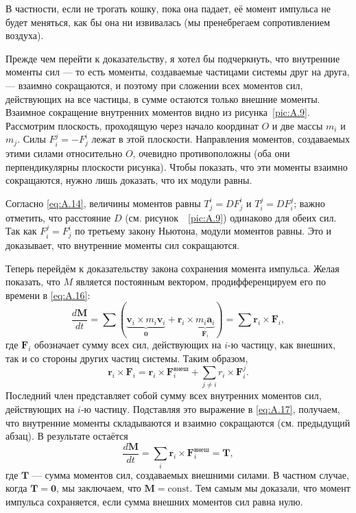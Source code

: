 В частности, если не трогать кошку, пока она падает, её момент импульса не будет меняться, как бы она ни извивалась (мы пренебрегаем сопротивлением воздуха).

Прежде чем перейти к доказательству, я хотел бы подчеркнуть, что
внутренние моменты сил --- то есть моменты, создаваемые частицами системы друг на друга, --- взаимно сокращаются,
и поэтому при сложении всех моментов сил, действующих на все частицы, в сумме остаются только внешние моменты.
Взаимное сокращение внутренних моментов видно из рисунка~\ref{pic:A.9}.
Рассмотрим плоскость, проходящую через начало координат $O$ и две массы $m_i$ и $m_j$.
Силы $F_{i}^{j}=-F_{j}^{i}$ лежат в этой плоскости.
Направления моментов, создаваемых этими силами относительно $O$, очевидно противоположны
(оба они перпендикулярны плоскости рисунка).
Чтобы показать, что эти моменты взаимно сокращаются, нужно лишь доказать, что их модули равны.

Согласно \eqref{eq:A.14}, величины моментов равны $T_{j}^{i}=D F_{j}^{i}$ и $T_{i}^{j}=D F_{i}^{j}$;
важно отметить, что расстояние $D$ (см. рисунок~~\ref{pic:A.9}) одинаково для обеих сил.
Так как $F_{i}^{j}=F_{j}^{i}$ по третьему закону Ньютона, модули моментов равны.
Это и доказывает, что внутренние моменты сил сокращаются.

Теперь перейдём к доказательству закона сохранения момента импульса.
Желая показать, что $M$ является постоянным вектором, продифференцируем его по времени в \eqref{eq:A.16}:
\begin{equation}
\frac{d\mathbf{M}}{dt}
= \sum \left( \underbrace{\mathbf{v}_i \times m_i \mathbf{v}_i}_{\mathbf{0}}+\mathbf{r}_i \times \underbrace{m_i \mathbf{a}_i}_{\mathbf{F}_i} \right)
= \sum \mathbf{r}_i \times \mathbf{F}_i,
\label{eq:A.17}
\end{equation}
где $\mathbf{F}_i$ обозначает сумму всех сил, действующих на $i$-ю частицу, как внешних, так и со стороны других частиц системы.
Таким образом,
\[
\mathbf{r}_i \times \mathbf{F}_i=\mathbf{r}_i \times \mathbf{F}_i^{\text{внеш}}+\sum_{j \ne i} r_i \times \mathbf{F}_{i}^{j}.
\]
Последний член представляет собой сумму всех внутренних моментов сил, действующих на $i$-ю частицу.
Подставляя это выражение в \eqref{eq:A.17}, получаем, что внутренние моменты складываются и взаимно сокращаются (см. предыдущий абзац).
В результате остаётся
\begin{equation}
\frac{d\mathbf{M}}{dt}=\sum_i \mathbf{r}_i \times \mathbf{F}_i^{\text{внеш}}=\mathbf{T},
\label{eq:A.18}
\end{equation}
где $\mathbf{T}$ --- сумма моментов сил, создаваемых внешними силами.
В частном случае, когда $\mathbf{T}=\mathbf{0}$, мы заключаем, что $\mathbf{M}=\text{const}$.
Тем самым мы доказали, что момент импульса сохраняется, если сумма внешних моментов сил равна нулю.

